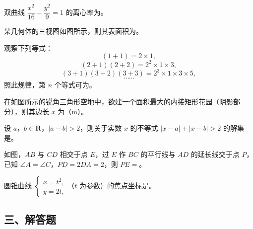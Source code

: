 \begin{question}
双曲线 $\dfrac{x^2}{16}-\dfrac{y^2}{9}=1$ 的离心率为\gkblank{}。

\Needspace{0.4\textheight}
\end{question}
\begin{question}
某几何体的三视图如图所示，则其表面积为\gkblank{}。
\nopagebreak[4]
\begin{center}\end{center}
\nopagebreak[4]
\end{question}
\begin{question}
观察下列等式：
\nopagebreak[4]
\[(1+1)=2\times1,\]
\nopagebreak[4]
\[(2+1)(2+2)=2^2\times1\times3,\]
\nopagebreak[4]
\[(3+1)(3+2)(3+3)=2^3\times1\times3\times5,\]
\nopagebreak[4]
\[\cdots\cdots\]
照此规律，第 $n$ 个等式可为\gkblank{}。

\Needspace{0.4\textheight}
\end{question}
\begin{question}
在如图所示的锐角三角形空地中，欲建一个面积最大的内接矩形花园（阴影部分），则其边长 $x$ 为\gkblank{}（m）。
\nopagebreak[4]
\begin{center}\end{center}
\nopagebreak[4]
\end{question}
\begin{question}
设 $a$，$b\in\mathbf R$，$|a-b|>2$，则关于实数 $x$ 的不等式 $|x-a|+|x-b|>2$ 的解集是\gkblank{}。

\Needspace{0.4\textheight}
\end{question}
\begin{question}
如图，$AB$ 与 $CD$ 相交于点 $E$，过 $E$ 作 $BC$ 的平行线与 $AD$ 的延长线交于点 $P$，已知 $\angle A=\angle C$，$PD=2DA=2$，则 $PE=$\gkblank{}。
\nopagebreak[4]
\begin{center}\end{center}
\nopagebreak[4]
\end{question}
\begin{question}
圆锥曲线 $\begin{cases}x=t^2,\\y=2t,\end{cases}$（$t$ 为参数）的焦点坐标是\gkblank{}。

\end{question}
\begingroup
\renewcommand{\gkpart}[1]{\Needspace{0.2\textheight}\subsection*{#1}\nopagebreak}
\gkpart{三、解答题}
\endgroup

